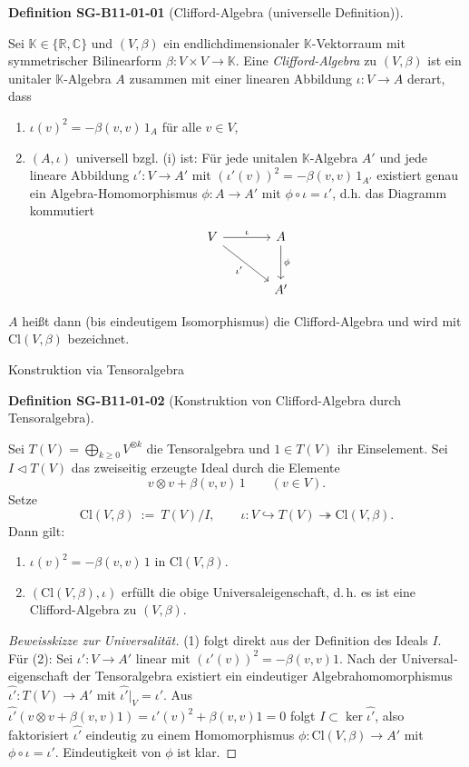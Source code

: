 \documentclass[10pt, letterpaper]{article}
\newcommand{\Cl}{\mathrm{Cl}}
\newcommand{\CustomHeading}[3]{%
  \par\medskip\noindent%
  \textbf{#1 #2} \textnormal{(#3)}.\enskip%
}
\newenvironment{DEF}[2]{\begin{unitbox}\CustomHeading{Definition}{#1}{#2}}{\end{unitbox}}
\begin{document}
\begin{DEF}{SG-B11-01-01}{Clifford-Algebra (universelle Definition)}
Sei $\mathbb K\in\{\mathbb R,\mathbb C\}$ und $(V,\beta)$ ein endlichdimensionaler
$\mathbb K$-Vektorraum mit symmetrischer Bilinearform $\beta:V\times V\to\mathbb K$.
Eine \emph{Clifford-Algebra} zu $(V,\beta)$ ist ein unitaler $\mathbb K$-Algebra
$A$ zusammen mit einer linearen Abbildung $\iota:V\to A$ derart, dass
\begin{enumerate}\itemsep0.2em
\item[(i)] $\iota(v)^2=-\beta(v,v)\,1_A$ für alle $v\in V$,
\item[(ii)] $(A,\iota)$ universell bzgl. (i) ist: Für jede unitalen $\mathbb K$-Algebra
$A'$ und jede lineare Abbildung $\iota':V\to A'$ mit $(\iota'(v))^2=-\beta(v,v)\,1_{A'}$
existiert genau ein Algebra-Homomorphismus $\phi:A\to A'$ mit $\phi\circ\iota=\iota'$, d.h. das Diagramm kommutiert
\[
\begin{tikzcd}[row sep=large, column sep=large]
V \arrow[r, "\iota"] \arrow[dr, "\iota'"'] & A \arrow[d, "\phi"] \\
& A'
\end{tikzcd}
\]
\end{enumerate}
$A$ heißt dann (bis eindeutigem Isomorphismus) die Clifford-Algebra und wird mit
$\Cl(V,\beta)$ bezeichnet.
\end{DEF}


Konstruktion via Tensoralgebra

\begin{DEF}{SG-B11-01-02}{Konstruktion von Clifford-Algebra durch Tensoralgebra}
Sei $T(V)=\bigoplus_{k\ge0}V^{\otimes k}$ die Tensoralgebra und $1\in T(V)$ ihr Einselement.
Sei $I\lhd T(V)$ das zweiseitig erzeugte Ideal durch die Elemente
\[
v\otimes v + \beta(v,v)\,1\qquad (v\in V).
\]
Setze
\[
\Cl(V,\beta)\ :=\ T(V)\big/I,\qquad \iota:V\hookrightarrow T(V)\twoheadrightarrow \Cl(V,\beta).
\]
Dann gilt:
\begin{enumerate}\itemsep0.2em
\item $\iota(v)^2= -\beta(v,v)\,1$ in $\Cl(V,\beta)$.
\item $(\Cl(V,\beta),\iota)$ erfüllt die obige Universal­eigenschaft, d.\,h. es ist
eine Clifford-Algebra zu $(V,\beta)$.
\end{enumerate}


\begin{proof}[Beweisskizze zur Universalität]
(1) folgt direkt aus der Definition des Ideals $I$.
Für (2): Sei $\iota':V\to A'$ linear mit $(\iota'(v))^2=-\beta(v,v)1$. Nach der
Universal­eigenschaft der Tensoralgebra existiert ein eindeutiger Algebrahomomorphismus
$\widehat{\iota'}:T(V)\to A'$ mit $\widehat{\iota'}|_V=\iota'$. Aus
$\widehat{\iota'}(v\otimes v+\beta(v,v)1)=\iota'(v)^2+\beta(v,v)1=0$ folgt $I\subset\ker\widehat{\iota'}$,
also faktorisiert $\widehat{\iota'}$ eindeutig zu einem Homomorphismus
$\phi:\Cl(V,\beta)\to A'$ mit $\phi\circ\iota=\iota'$. Eindeutigkeit von $\phi$
ist klar.
\end{proof}
\end{DEF}
\end{document}
